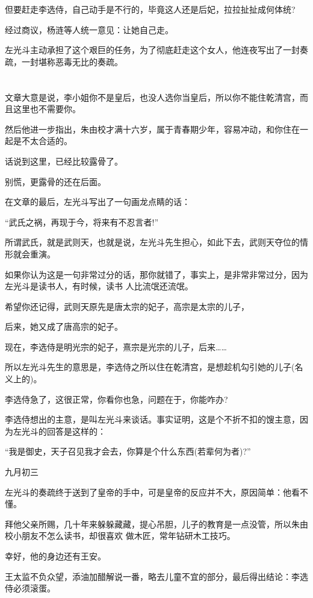 \documentclass[11pt,a4paper,onecolumn]{article}
\begin{document}
但要赶走李选侍，自己动手是不行的，毕竟这人还是后妃，拉拉扯扯成何体统?

经过商议，杨涟等人统一意见：让她自己走。

左光斗主动承担了这个艰巨的任务，为了彻底赶走这个女人，他连夜写出了一封奏疏，一封堪称恶毒无比的奏疏。

\section[\thesection]{}

文章大意是说，李小姐你不是皇后，也没人选你当皇后，所以你不能住乾清宫，而且这里也不需要你。

然后他进一步指出，朱由校才满十六岁，属于青春期少年，容易冲动，和你住在一起是不太合适的。

话说到这里，已经比较露骨了。

别慌，更露骨的还在后面。

在文章的最后，左光斗写出了一句画龙点睛的话：

``武氏之祸，再现于今，将来有不忍言者!''

所谓武氏，就是武则天，也就是说，左光斗先生担心，如此下去，武则天夺位的情形就会重演。

如果你认为这是一句非常过分的话，那你就错了，事实上，是非常非常过分，因为左光斗是读书人，有时候，读书
人比流氓还流氓。

希望你还记得，武则天原先是唐太宗的妃子，高宗是太宗的儿子，

后来，她又成了唐高宗的妃子。

现在，李选侍是明光宗的妃子，熹宗是光宗的儿子，后来……

所以左光斗先生的意思是，李选侍之所以住在乾清宫，是想趁机勾引她的儿子(名义上的)。

李选侍急了，这很正常，你看你也急，问题在于，你能咋办?

李选侍想出的主意，是叫左光斗来谈话。事实证明，这是个不折不扣的馊主意，因为左光斗的回答是这样的：

``我是御史，天子召见我才会去，你算是个什么东西(若辈何为者)?''

九月初三

左光斗的奏疏终于送到了皇帝的手中，可是皇帝的反应并不大，原因简单：他看不懂。

拜他父亲所赐，几十年来躲躲藏藏，提心吊胆，儿子的教育是一点没管，所以朱由校小朋友不怎么读书，却很喜欢
做木匠，常年钻研木工技巧。

幸好，他的身边还有王安。

王太监不负众望，添油加醋解说一番，略去儿童不宜的部分，最后得出结论：李选侍必须滚蛋。
\end{document}

